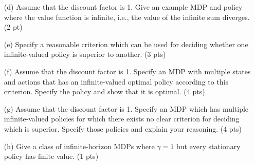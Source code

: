 \documentclass[12pt]{article}
\begin{document}
\begin{itemize}

\item[(d)] Assume that the discount factor is 1.  Give an example MDP and policy where the value function is infinite, i.e., the value of the infinite sum diverges. (2 pt)

\begin{solution}
\end{solution}

\item[(e)] Specify a reasonable criterion which can be used for deciding whether one infinite-valued policy is superior to another. (3  pts)

\begin{solution}
\end{solution}

\item[(f)] Assume that the discount factor is 1. Specify an MDP with multiple states and actions that has an infinite-valued optimal policy according to this criterion. Specify the policy and show that it is optimal. (4 pts)

\begin{solution}
\end{solution}

\item[(g)] Assume that the discount factor is 1. Specify an MDP which has multiple infinite-valued policies for which there exists no clear criterion for deciding which is superior. Specify those policies and explain your reasoning. (4 pts)

\begin{solution}
\end{solution}

\item[(h)] Give a class of infinite-horizon MDPs where $\gamma=1$ but every stationary policy has finite value. (1 pts)

\begin{solution}
\end{solution}
\end{itemize}
\end{document}
